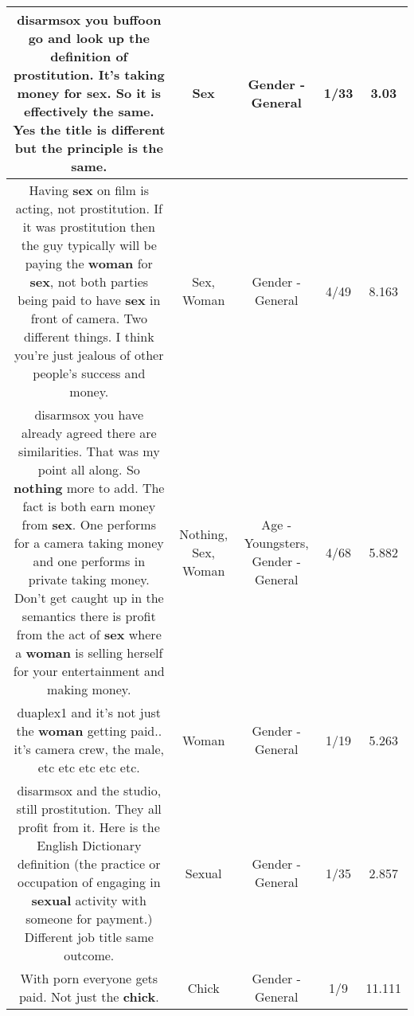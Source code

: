 \documentclass[11pt]{article}
\newlength\mylength
\begin{document}
\begin{center}
\begin{longtable}{|C{.65\mylength}|C{.30\mylength}|C{.12\mylength}|C{.12\mylength}|C{.12\mylength}|}
  \small disarmsox you buffoon go and look up the definition of prostitution. It's taking money for \textbf{sex}. So it is effectively the same. Yes the title is different but the principle is the same.\normalsize   & Sex & Gender - General & 1/33 & 3.03 \\  \hline
  \small Having \textbf{sex} on film is acting, not prostitution. If it was prostitution then the guy typically will be paying the \textbf{woman} for \textbf{sex}, not both parties being paid to have \textbf{sex} in front of camera. Two different things. I think you're just jealous of other people's success and money.\normalsize   & Sex, Woman & Gender - General & 4/49 & 8.163 \\  \hline
  \small disarmsox you have already agreed there are similarities. That was my point all along. So \textbf{nothing} more to add. The fact is both earn money from \textbf{sex}. One performs for a camera taking money and one performs in private taking money. Don't get caught up in the semantics there is profit from the act of \textbf{sex} where a \textbf{woman} is selling herself for your entertainment and making money.\normalsize   & Nothing, Sex, Woman & Age - Youngsters, Gender - General & 4/68 & 5.882 \\  \hline
  \small duaplex1 and it's not just the \textbf{woman} getting paid.. it's camera crew, the male, etc etc etc etc etc.\normalsize   & Woman & Gender - General & 1/19 & 5.263 \\  \hline
  \small disarmsox and the studio, still prostitution. They all profit from it. Here is the English Dictionary definition (the practice or occupation of engaging in \textbf{sexual} activity with someone for payment.) Different job title same outcome.\normalsize   & Sexual & Gender - General & 1/35 & 2.857 \\  \hline
  \small With porn everyone gets paid. Not just the \textbf{chick}.\normalsize   & Chick & Gender - General & 1/9 & 11.111 \\  \hline

\end{longtable}
\end{center}
\end{document}
